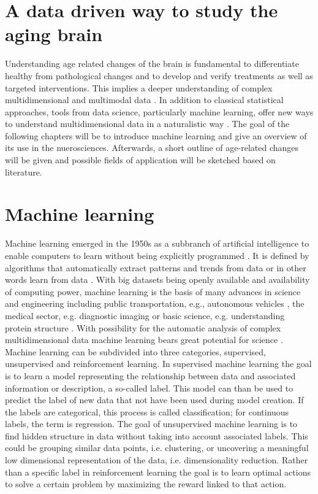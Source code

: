 \section{A data driven way to study the aging brain}
Understanding age related changes of the brain is fundamental to differentiate healthy from pathological changes and to develop and verify treatments as well as targeted interventions. This implies a deeper understanding of complex multidimensional and multimodal data \cite{Brunton2019}. In addition to classical statistical approaches, tools from data science, particularly machine learning, offer new ways to understand multidimensional data in a naturalistic way \cite{Breiman2001}. The goal of the following chapters will be to introduce machine learning and give an overview of its use in the nuerosciences. Afterwards, a short outline of age-related changes will be given and possible fields of application will be sketched based on literature.   

\section{Machine learning}
Machine learning emerged in the 1950s as a subbranch of artificial intelligence to enable computers to learn without being explicitly programmed \cite{Samual1959}. It is defined by algorithms that automatically extract patterns and trends from data or in other words learn from data \cite{Hastie2009}. With big datasets being openly available and availability of computing power, machine learning is the basis of many advances in science and engineering including public transportation, e.g., autonomous vehicles \cite{Leonard2020}, the medical sector, e.g. diagnostic imaging \cite{Liu2020} or basic science, e.g. understanding protein structure \cite{Jumper2021}. With possibility for the automatic analysis of complex multidimensional data machine learning bears great potential for science \cite{Brunton2019}.\\
Machine learning can be subdivided into three categories, supervised, unsupervised and reinforcement learning. In supervised machine learning the goal is to learn a model representing the relationship between data and associated information or description, a so-called label. This model can than be used to predict the label of new data that not have been used during model creation. If the labels are categorical, this process is called classification; for continuous labels, the term is regression. The goal of unsupervised machine learning is to find hidden structure in data without taking into account associated labels. This could be grouping similar data points, i.e. clustering, or uncovering a meaningful low dimensional representation of the data, i.e. dimensionality reduction. Rather than a specific label in reinforcement learning the goal is to learn optimal actions to solve a certain problem by maximizing the reward linked to that action.

